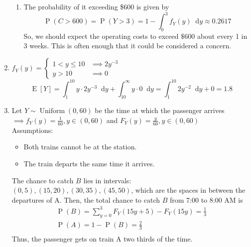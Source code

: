 \documentclass{article}
\newcommand{\pr}[1]{\operatorname{P}\left(#1\right)}
\newcommand{\expt}[1]{\operatorname{E}[#1]}
\newcommand{\unidist}[3]{#1 \sim \operatorname{Uniform}(#2, #3)}
\newcommand*\diff{\mathop{}\!\mathrm{d}}
\newcommand{\intv}[4]{\int_{#3}^{#4} #1 \diff #2}
\begin{document}
\begin{enumerate}
\begin{enumerate}
    \item The probability of it exceeding \$600 is given by
    \[
      \pr{C > 600} = \pr{Y > 3} = 1 - \intv{f_Y(y)}{y}{0}{3} \approx 0.2617
    \]
    So, we should expect the operating costs
    to exceed $\$600$ about every 1 in 3 weeks. This is often enough
    that it could be considered a concern.
  \end{enumerate}

  \item $f_Y(y) = \begin{cases}
    1 < y \leq 10 & \implies 2y^{-3}\\
    y > 10 & \implies 0
  \end{cases}$
  \[
    \expt{Y} = 
    \intv{y\cdot 2y^{-3}}{y}{1}{10} + \intv{y\cdot 0}{y}{10}{\infty}
    = \intv{2y^{-2}}{y}{1}{10} + 0 = 1.8
  \]

  \item Let $\unidist{Y}{0}{60}$ 
  be the time at which the passenger arrives\\
  $\implies f_Y(y) = \frac{1}{60}, y\in(0,60)$ and $F_Y(y) = \frac{y}{60}, y\in(0,60)$\\
  Assumptions: \begin{itemize}
    \item Both trains cannot be at the station.
    \item The train departs the same time it arrives.
  \end{itemize}
  The chance to catch $B$ lies in intervals: $(0, 5), (15, 20), (30,35), (45,50)$,
  which are the spaces in between the departures of A.
  Then, the total chance to catch $B$ from 7:00 to 8:00 AM is
  \begin{align*}
    \pr{B} = \sum_{y=0}^{3}F_Y(15y+5) - F_Y(15y) = \frac{1}{3}\\
    \pr{A} = 1 - \pr{B} = \frac{2}{3}\\
  \end{align*}
  Thus, the passenger gets on train A two thirds of the time.


\end{enumerate}
\end{document}
